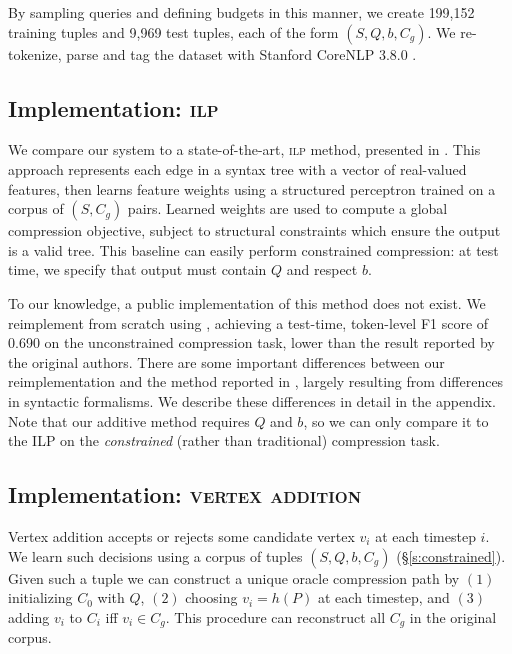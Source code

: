 \documentclass[11pt,a4paper]{article}
\begin{document}
By sampling queries and defining budgets in this manner, we create {199,152} training tuples and {9,969} test tuples, each of the form $(S,Q,b,C_g)$. We re-tokenize, parse and tag the dataset with Stanford CoreNLP 3.8.0 \cite{corenlp}.

\subsection{Implementation: \textsc{ilp}}\label{s:ilp}

We compare our system to a state-of-the-art, \textsc{ilp} method, presented in \citet{filippova2013overcoming}. This approach represents each edge in a syntax tree with a vector of real-valued features, then learns feature weights using a structured perceptron trained on a corpus of $(S,C_g)$ pairs. Learned weights are used to compute a global compression objective, subject to structural constraints which ensure the output is a valid tree. This baseline can easily perform constrained compression: at test time, we specify that output must contain $Q$ and respect $b$.

To our knowledge, a public implementation of this method does not exist. We reimplement from scratch using \citet{gurobi}, achieving a test-time, token-level F1 score of  0.690 on the unconstrained compression task, lower than the result reported by the original authors. There are some important differences between our reimplementation and the method reported in \citet{filippova2013overcoming}, largely resulting from differences in syntactic formalisms. We describe these differences in detail in the appendix. Note that our additive method requires $Q$ and $b$, so we can only compare it to the ILP on the \textit{constrained} (rather than traditional) compression task.

\subsection{Implementation: \textsc{vertex addition}}\label{s:transition}

Vertex addition accepts or rejects some candidate vertex $v_i$ at each timestep $i$. 
We learn such decisions using a corpus of tuples $(S,Q,b,C_g)$ (\S\ref{s:constrained}). Given such a tuple we can construct a unique oracle compression path by $(1)$ initializing $C_0$ with $Q$, $(2)$ choosing $v_i = h(P)$ at each timestep, and $(3)$ adding $v_i$ to $C_i$ iff $v_i \in C_g$. This procedure can reconstruct all $C_g$ in the original \citet{filippova2013overcoming} corpus. 
\end{document}
